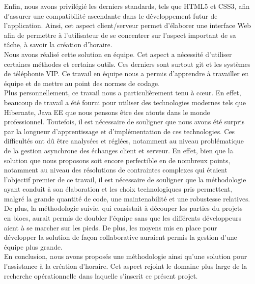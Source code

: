 \newline
\indent
Enfin, nous avons privilégié les derniers standards, tels que HTML5 et CSS3, afin d'assurer une compatibilité ascendante dans le développement futur de l'application.
Ainsi, cet aspect client/serveur permet d'élaborer une interface Web afin de permettre à l'utilisateur de se concentrer sur l'aspect important de sa tâche, à savoir la création d'horaire.\\
\newline
\indent
Nous avons réalisé cette solution en équipe. Cet aspect a nécessité d'utiliser certaines méthodes et certains outils. Ces derniers sont surtout git et les systèmes de téléphonie VIP. Ce travail en équipe nous a permis d'apprendre à travailler en équipe et de mettre au point des normes de codage.\\
\newline
\indent
Plus personnellement, ce travail nous a particulièrement tenu à cœur. En effet, beaucoup de travail a été fourni pour utiliser des technologies modernes tels que Hibernate, Java EE que nous pensons être des atouts dans le monde professionnel. Toutefois, il est nécessaire de souligner que nous avons été surpris par la longueur d'apprentissage et d'implémentation de ces technologies. Ces difficultés ont dû être analysées et réglées, notamment au niveau problématique de la gestion asynchrone des échanges client et serveur.
\newline
\indent
En effet, bien que la solution que nous proposons soit encore perfectible en de nombreux points, notamment au niveau des résolutions de contraintes complexes qui étaient l'objectif premier de ce travail, il est nécessaire de souligner que la méthodologie ayant conduit à son élaboration et les choix technologiques pris permettent, malgré la grande quantité de code, une maintenabilité et une robustesse relatives.
\newline
\indent
De plus, la méthodologie suivie, qui consistait à découper les parties du projets en blocs, aurait permis de doubler l'équipe sans que les différents développeurs aient à se marcher sur les pieds. De plus, les moyens mis en place pour développer la solution de façon collaborative auraient permis la gestion d'une équipe plus grande.\\
\newline
\indent
En conclusion, nous avons proposés une méthodologie ainsi qu'une solution pour l'assistance à la création d'horaire. Cet aspect rejoint le domaine plus large de la recherche opérationnelle dans laquelle s'inscrit ce présent projet. 



